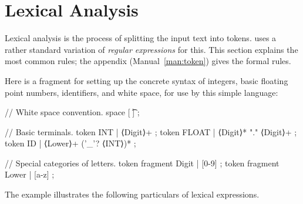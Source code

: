 \documentclass[12pt]{article} %
\begin{document}
\section{Lexical Analysis}
\label{sec:tokens}

Lexical analysis is the process of splitting the input text into tokens. \HAX uses a rather standard
variation of \emph{regular expressions} for this. This section explains the most common rules; the
appendix (Manual~\ref{man:token}) gives the formal rules.

\begin{example}\label{ex:lexical}
  Here is a \HAX fragment for setting up the concrete syntax of integers, basic floating point
  numbers, identifiers, and white space, for use by this simple language:
  \begin{hacs}[xleftmargin=\parindent,numbers=right,texcl]
// White space convention.
space [ \t\n] ;

// Basic terminals.
token INT  | ⟨Digit⟩+ ;
token FLOAT  | ⟨Digit⟩* "." ⟨Digit⟩+ ;
token ID  | ⟨Lower⟩+ ('_'? ⟨INT⟩)* ;

// Special categories of letters.
token fragment Digit  | [0-9] ;
token fragment Lower  | [a-z] ;
  \end{hacs}
\end{example}

The example illustrates the following particulars of \HAX lexical expressions.
\end{document}
